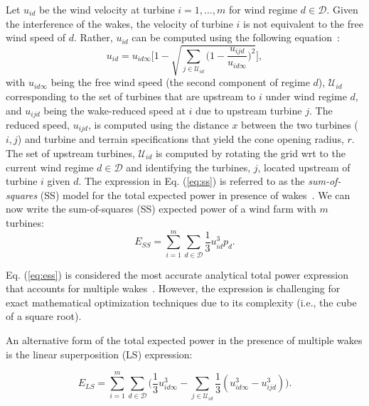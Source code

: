 \documentclass[preprint,12pt]{elsarticle}
\begin{document}
Let $u_{id}$ be the wind velocity at turbine $i = 1,\ldots, m$ for wind regime $d\in\mathcal{D}$.
  Given the interference of the wakes, the velocity of turbine $i$ is not equivalent to the free wind speed of $d$.
Rather, $u_{id}$ can be computed using the following equation~\cite{Zhang2014}:
\begin{equation}
u_{id} = u_{id\infty} \Bigg[1 - \sqrt{\sum_{j\in\mathcal{U}_{id}} \bigg( 1-\frac{u_{ijd}}{u_{id\infty}} \bigg)^2}  \Bigg], \label{eq:ss}
\end{equation} with $u_{id\infty}$ being the free wind speed (the second component of regime $d$), $\mathcal{U}_{id}$ corresponding to the set of turbines  that are upstream to $i$ 
under wind regime $d$, and $u_{ijd}$ being the wake-reduced speed at $i$ due to upstream turbine $j$. 
The reduced speed, $u_{ijd}$, is computed using the distance $x$ between the two turbines ($i,j$)  and turbine and terrain specifications that yield the cone opening radius, $r$. The set of upstream turbines, $\mathcal{U}_{id}$ is computed  
by rotating the grid wrt to the current wind regime $d \in \mathcal{D}$ and identifying the turbines, $j$, located upstream of turbine $i$ given $d$. The expression in Eq. (\ref{eq:ss}) is referred to as the \emph{sum-of-squares} (SS) model for 
the total expected power in presence of wakes~\cite{Zhang2014}.  We can now write 
the sum-of-squares (SS) expected power of a wind farm with $m$ turbines:
\begin{equation}
  E_{SS} = \sum_{i=1}^m \sum_{d\in\mathcal{D}} \frac{1}{3} u_{id}^3p_d.\label{eq:ess}
\end{equation}

  Eq. (\ref{eq:ess}) is considered the most accurate analytical total power expression that accounts for multiple wakes~\cite{jensen1983note}. 
  However, the expression is challenging for exact mathematical optimization techniques due to its complexity (i.e., the cube of a square root).

An alternative 
form of the total expected power in the presence of multiple wakes is the linear superposition (LS) expression:

\begin{equation} \label{eq:ls}
E_{LS} = \sum_{i=1}^m \sum_{d\in\mathcal{D}} \Bigg(\frac{1}{3}u_{id\infty}^3 -\sum_{j\in\mathcal{U}_{id}} \frac{1}{3}(u_{id\infty}^3 - u_{ijd}^3)\Bigg).
\end{equation}
\end{document}
